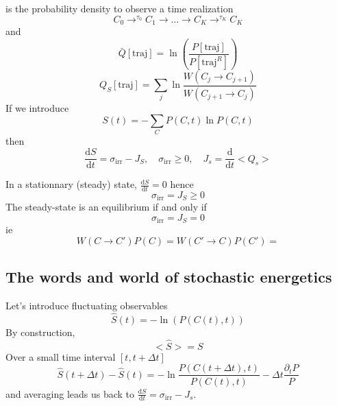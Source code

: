 \documentclass[a4paper]{book}
\theoremstyle{definition}
\theoremstyle{remark}
\begin{document}
is the probability density to observe a time realization
\begin{equation}
    C_0 \rightarrow^{\tau_0} C_1 \rightarrow \dots \rightarrow C_K \rightarrow^{\tau_K} C_K
\end{equation}
and 
\begin{equation}
    \bar{Q}[\text{traj}] = \ln(\frac{P[\text{traj}]}{P[\text{traj}^R]})
\end{equation}
\begin{equation}
    Q_S[\text{traj}] = \sum_j \ln{\frac{W(C_j \rightarrow C_{j+1})}{W(C_{j+1} \rightarrow C_j)}}
\end{equation}
If we introduce 
\begin{equation}
    S(t) = -\sum_C P(C, t) \ln P(C, t)
\end{equation}
then 
\begin{equation}
    \frac{\text{d}S}{\text{d}t} = \sigma_{\text{irr}} - J_S, \quad \sigma_{\text{irr}} \geq 0, \quad J_s = \frac{\text{d}}{\text{d}t}<Q_s>
\end{equation}

In a stationnary (steady) state, $\frac{\text{d}S}{\text{d}t} = 0$ hence 
\begin{equation}
    \sigma_{\text{irr}} = J_S \geq 0
\end{equation}
The steady-state is an equilibrium if and only if 
\begin{equation}
    \sigma_{\text{irr}} = J_S = 0
\end{equation}
ie 
\begin{equation}
    W(C \rightarrow C') P(C) = W(C' \rightarrow C) P(C') = 
\end{equation}

\subsection{The words and world of stochastic energetics}
Let's introduce fluctuating observables
\begin{equation}
    \hat{S}(t) = -\ln(P(C(t), t))
\end{equation}
By construction, 
\begin{equation}
    <\hat{S}> = S
\end{equation}
Over a small time interval $[t, t+\Delta t]$
\begin{equation}
    \hat{S}(t + \Delta t) - \hat{S}(t) = -\ln \frac{P(C(t + \Delta t), t)}{P(C(t), t)} - \Delta t \frac{\partial_t P}{P}
\end{equation}
and averaging leads us back to $\frac{\text{d}S}{\text{d}t} = \sigma_{\text{irr}} - J_s$. 
\end{document}
